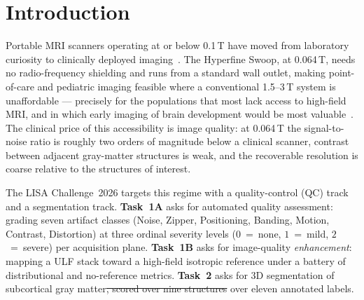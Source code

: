 \documentclass[runningheads]{llncs}
\newcommand{\addone}[1]{\textcolor{revone}{#1}}
\newcommand{\delone}[1]{\textcolor{revone}{\sout{#1}}}
\begin{document}
\FloatBarrier
\section{Introduction}
\label{sec:intro}

Portable MRI scanners operating at or below 0.1\,T have moved from laboratory
curiosity to clinically deployed imaging~\cite{marques2019low,sheth2021portable}.
The Hyperfine Swoop, at 0.064\,T, needs no radio-frequency shielding and runs
from a standard wall outlet, making point-of-care and pediatric imaging feasible
where a conventional 1.5--3\,T system is unaffordable --- precisely for the
populations that most lack access to high-field MRI, and in which early imaging of
brain development would be most valuable~\cite{arnold2023low,sarracanie2020}.
The clinical price of this accessibility is image quality: at 0.064\,T the
signal-to-noise ratio is roughly two orders of magnitude below a clinical
scanner, contrast between adjacent gray-matter structures is weak, and the
recoverable resolution is coarse relative to the structures of interest.

The LISA Challenge~2026 targets this regime with a quality-control (QC) track and
a segmentation track. \textbf{Task~1A} asks for automated quality assessment:
grading seven artifact classes (Noise, Zipper, Positioning, Banding, Motion,
Contrast, Distortion) at three ordinal severity levels ($0$~=~none, $1$~=~mild,
$2$~=~severe) per acquisition plane. \textbf{Task~1B} asks for image-quality
\emph{enhancement}: mapping a ULF stack toward a high-field isotropic reference
under a battery of distributional and no-reference metrics. \textbf{Task~2} asks
for 3D segmentation of subcortical gray matter\delone{, scored over nine
structures}\addone{ over eleven annotated labels}.
\end{document}
